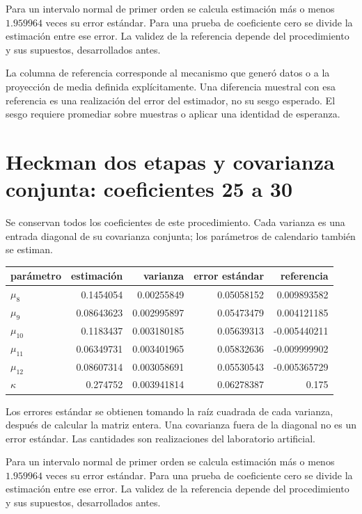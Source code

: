 \documentclass[11pt,a4paper]{article}
\begin{document}
Para un intervalo normal de primer orden se calcula estimación más o menos $1.959964$ veces su error estándar. Para una prueba de coeficiente cero se divide la estimación entre ese error. La validez de la referencia depende del procedimiento y sus supuestos, desarrollados antes.

La columna de referencia corresponde al mecanismo que generó datos o a la proyección de media definida explícitamente. Una diferencia muestral con esa referencia es una realización del error del estimador, no su sesgo esperado. El sesgo requiere promediar sobre muestras o aplicar una identidad de esperanza.

\clearpage
\section{Heckman dos etapas y covarianza conjunta: coeficientes 25 a 30}
Se conservan todos los coeficientes de este procedimiento. Cada varianza es una entrada diagonal de su covarianza conjunta; los parámetros de calendario también se estiman.
\begin{center}\small
\begin{tabular}{lrrrr}
\toprule
parámetro & estimación & varianza & error estándar & referencia\\\midrule
$\mu_8$ & 0.1454054 & 0.00255849 & 0.05058152 & 0.009893582\\
$\mu_9$ & 0.08643623 & 0.002995897 & 0.05473479 & 0.004121185\\
$\mu_10$ & 0.1183437 & 0.003180185 & 0.05639313 & -0.005440211\\
$\mu_11$ & 0.06349731 & 0.003401965 & 0.05832636 & -0.009999902\\
$\mu_12$ & 0.08607314 & 0.003058691 & 0.05530543 & -0.005365729\\
$\kappa$ & 0.274752 & 0.003941814 & 0.06278387 & 0.175\\
\bottomrule
\end{tabular}\end{center}

Los errores estándar se obtienen tomando la raíz cuadrada de cada varianza, después de calcular la matriz entera. Una covarianza fuera de la diagonal no es un error estándar. Las cantidades son realizaciones del laboratorio artificial.

Para un intervalo normal de primer orden se calcula estimación más o menos $1.959964$ veces su error estándar. Para una prueba de coeficiente cero se divide la estimación entre ese error. La validez de la referencia depende del procedimiento y sus supuestos, desarrollados antes.
\end{document}
